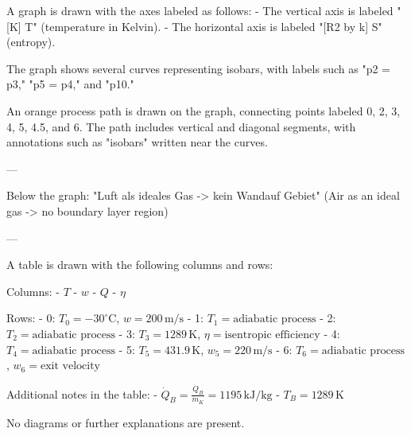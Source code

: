 A graph is drawn with the axes labeled as follows:  
- The vertical axis is labeled "[K] T" (temperature in Kelvin).  
- The horizontal axis is labeled "[R2 by k] S" (entropy).  

The graph shows several curves representing isobars, with labels such as "p2 = p3," "p5 = p4," and "p10."  

An orange process path is drawn on the graph, connecting points labeled 0, 2, 3, 4, 5, 4.5, and 6. The path includes vertical and diagonal segments, with annotations such as "isobars" written near the curves.  

---

Below the graph:  
"Luft als ideales Gas -> kein Wandauf Gebiet"  
(Air as an ideal gas -> no boundary layer region)  

---

A table is drawn with the following columns and rows:  

Columns:  
- \( T \)  
- \( w \)  
- \( Q \)  
- \( \eta \)  

Rows:  
- 0: \( T_0 = -30^\circ \text{C} \), \( w = 200 \, \text{m/s} \)  
- 1: \( T_1 = \text{adiabatic process} \)  
- 2: \( T_2 = \text{adiabatic process} \)  
- 3: \( T_3 = 1289 \, \text{K} \), \( \eta = \text{isentropic efficiency} \)  
- 4: \( T_4 = \text{adiabatic process} \)  
- 5: \( T_5 = 431.9 \, \text{K} \), \( w_5 = 220 \, \text{m/s} \)  
- 6: \( T_6 = \text{adiabatic process} \), \( w_6 = \text{exit velocity} \)  

Additional notes in the table:  
- \( \dot{Q}_B = \frac{\dot{Q}_B}{\dot{m}_K} = 1195 \, \text{kJ/kg} \)  
- \( T_B = 1289 \, \text{K} \)  

No diagrams or further explanations are present.